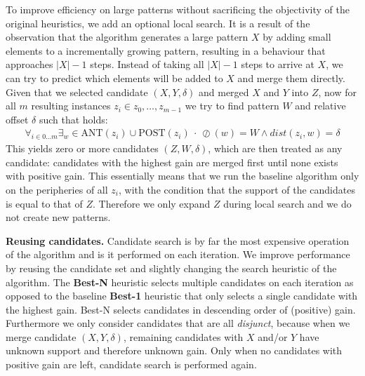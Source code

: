 \documentclass{llncs}
\begin{document}
To improve efficiency on large patterns without sacrificing the objectivity of the original heuristics, we add an optional local search. It is a result of the observation that the algorithm generates a large pattern $X$ by adding small elements to a incrementally growing pattern, resulting in a behaviour that approaches $|X|-1$ steps. Instead of taking all $|X|-1$ steps to arrive at $X$, we can try to predict which elements will be added to $X$ and merge them directly. Given that we selected candidate $(X,Y,\delta)$ and merged $X$ and $Y$ into $Z$, now for all $m$ resulting instances $z_i \in {z_0,\dots,z_{m-1}}$ we try to find pattern $W$ and relative offset $\delta$ such that holds:
\begin{align}
\label{floodfill}
\forall_{i\in 0\dots m} \exists_w \in \mathrm{ANT}(z_i) \cup \mathrm{POST}(z_i) \ \cdot \ \oslash(w) = W \land dist(z_i, w) = \delta 
\end{align}
\noindent This yields zero or more candidates $(Z,W,\delta)$, which are then treated as any candidate: candidates with the highest gain are merged first until none exists with positive gain. This essentially means that we run the baseline algorithm only on the peripheries of all $z_i$, with the condition that the support of the candidates is equal to that of $Z$. Therefore we only expand $Z$ during local search and we do not create new patterns. 



\smallskip \noindent \textbf{Reusing candidates.} Candidate search is by far the most expensive operation of the algorithm and is it performed on each iteration. We improve performance by reusing the candidate set and slightly changing the search heuristic of the algorithm. The \textbf{Best-N} heuristic selects multiple candidates on each iteration as opposed to the baseline \textbf{Best-1} heuristic that only selects a single candidate with the highest gain. Best-N selects candidates in descending order of (positive) gain. Furthermore we only consider candidates that are all \emph{disjunct}, because when we merge candidate $(X,Y,\delta)$, remaining candidates with $X$ and/or $Y$ have unknown support and therefore unknown gain. Only when no candidates with positive gain are left, candidate search is performed again.%
\end{document}
